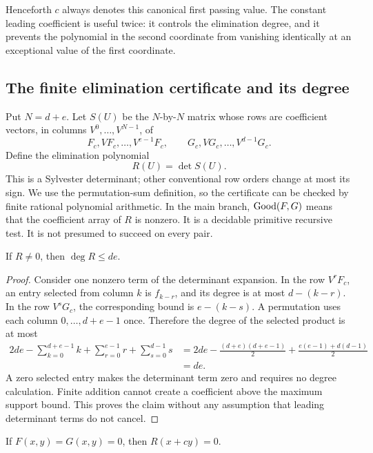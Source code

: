 Henceforth \(c\) always denotes this canonical first passing value.  The
constant leading coefficient is useful twice: it controls the elimination
degree, and it prevents the polynomial in the second coordinate from
vanishing identically at an exceptional value of the first coordinate.

\subsection{The finite elimination certificate and its degree}

Put \(N=d+e\).  Let \(S(U)\) be the \(N\)-by-\(N\) matrix whose rows
are coefficient vectors, in columns \(V^0,\ldots,V^{N-1}\), of
\[
 F_c,VF_c,\ldots,V^{e-1}F_c,
 \qquad G_c,VG_c,\ldots,V^{d-1}G_c.
\]
Define the elimination polynomial
\[
 R(U)=\det S(U).
 \tag{E4}\label{eq:elim-resultant}
\]
This is a Sylvester determinant; other conventional row orders change at
most its sign.  We use the permutation-sum definition, so the certificate
can be checked by finite rational polynomial arithmetic.  In the main
branch, \(\operatorname{Good}(F,G)\) means that the coefficient array of \(R\) is
nonzero.  It is a decidable primitive recursive test.  It is not presumed
to succeed on every pair.

\begin{lemma}\label{lem:elim-degree}
If \(R\ne0\), then \(\deg R\le de\).
\end{lemma}

\begin{proof}
Consider one nonzero term of the determinant expansion.  In the row
\(V^rF_c\), an entry selected from column \(k\) is \(f_{k-r}\), and
its degree is at most \(d-(k-r)\).  In the row \(V^sG_c\), the
corresponding bound is \(e-(k-s)\).  A permutation uses each column
\(0,\ldots,d+e-1\) once.  Therefore the degree of the selected product
is at most
\begin{align*}
 2de-\sum_{k=0}^{d+e-1}k
       +\sum_{r=0}^{e-1}r+\sum_{s=0}^{d-1}s
 &=2de-\frac{(d+e)(d+e-1)}2
          +\frac{e(e-1)+d(d-1)}2\\
 &=de.
\end{align*}
A zero selected entry makes the determinant term zero and requires no
degree calculation.  Finite addition cannot create a coefficient above
the maximum support bound.  This proves the claim without any assumption
that leading determinant terms do not cancel.
\end{proof}

\begin{lemma}
\label{lem:elim-root}
If \(F(x,y)=G(x,y)=0\), then \(R(x+cy)=0\).
\end{lemma}

